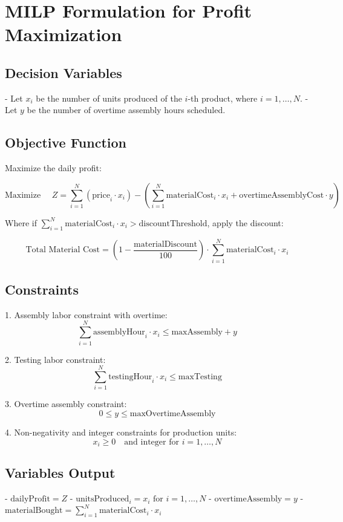\documentclass{article}
\begin{document}
\section*{MILP Formulation for Profit Maximization}

\subsection*{Decision Variables}
- Let $x_i$ be the number of units produced of the $i$-th product, where $i = 1, \ldots, N$.  
- Let $y$ be the number of overtime assembly hours scheduled.

\subsection*{Objective Function}
Maximize the daily profit:

\[
\text{Maximize } \quad Z = \sum_{i=1}^N (\text{price}_i \cdot x_i) - \left( \sum_{i=1}^N \text{materialCost}_i \cdot x_i + \text{overtimeAssemblyCost} \cdot y \right)
\]

Where if $\sum_{i=1}^N \text{materialCost}_i \cdot x_i > \text{discountThreshold}$, apply the discount:

\[
\text{Total Material Cost} = \left(1 - \frac{\text{materialDiscount}}{100}\right) \cdot \sum_{i=1}^N \text{materialCost}_i \cdot x_i
\]

\subsection*{Constraints}

1. Assembly labor constraint with overtime:
   \[
   \sum_{i=1}^N \text{assemblyHour}_i \cdot x_i \leq \text{maxAssembly} + y
   \]

2. Testing labor constraint:
   \[
   \sum_{i=1}^N \text{testingHour}_i \cdot x_i \leq \text{maxTesting}
   \]

3. Overtime assembly constraint:
   \[
   0 \leq y \leq \text{maxOvertimeAssembly}
   \]

4. Non-negativity and integer constraints for production units:
   \[
   x_i \geq 0 \quad \text{and integer for } i = 1, \ldots, N
   \]

\subsection*{Variables Output}

- $\text{dailyProfit} = Z$
- $\text{unitsProduced}_i = x_i \text{ for } i = 1, \ldots, N$
- $\text{overtimeAssembly} = y$
- $\text{materialBought} = \sum_{i=1}^N \text{materialCost}_i \cdot x_i$
\end{document}
